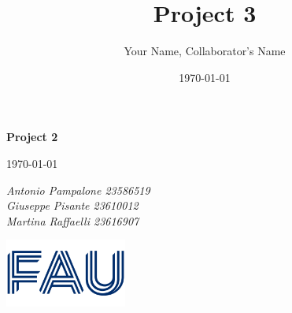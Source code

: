 \documentclass{article}
\title{Project 3}
\author{Your Name, Collaborator's Name}
\date{\today}
\begin{document}
\begin{titlepage}
    \centering
    \vspace*{1in}
    
    {\Huge\bfseries Project 2\par}
    \vspace{1.5cm}
    {\Large \today\par}
    \vspace{1.5cm}
    {\Large\itshape Antonio Pampalone 23586519 \\ Giuseppe Pisante 23610012\\ Martina Raffaelli 23616907 \par}
    
    \vfill
    \includegraphics[width=0.3\textwidth]{FAU-Logo.png}\par\vspace{1cm} %
   
\end{titlepage}

\newpage
\small
\end{document}
